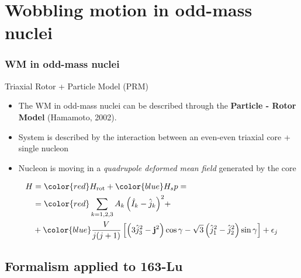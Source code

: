 \documentclass[
	11pt, %
]{beamer}
\begin{document}
\section{Wobbling motion in odd-mass nuclei}

\begin{frame}
	\frametitle{WM in odd-mass nuclei}

	\begin{exampleblock}{Triaxial Rotor + Particle Model (PRM)}
		\begin{itemize}
			\item The WM in odd-mass nuclei can be described through the \textbf{Particle - Rotor Model} (Hamamoto, 2002).
			\item System is described by the interaction between an even-even triaxial core + single nucleon
			\item Nucleon is moving in a \emph{quadrupole deformed mean field} generated by the core
		\end{itemize}
		\begin{align}
			H&={\color{red}H_\text{rot}}+{\color{blue}H_sp}=\nonumber\\
			&={\color{red}\sum_{k=1,2,3}A_k\left(\hat{I}_k-\hat{j}_k\right)^2}+\nonumber\\
			&+{\color{blue}\frac{V}{j(j+1)}\left[\left(3\hat{j}_3^2-\mathbf{j}^2\right)\cos\gamma-\sqrt{3}\left(\hat{j}_1^2-\hat{j}_2^2\right)\sin\gamma\right]+\epsilon_j}
		\end{align}
	\end{exampleblock}
\end{frame}

\subsection{Formalism applied to 163-Lu}
\end{document}
